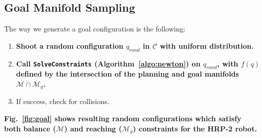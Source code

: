 \documentclass{article}
\newcommand\manifold{\mathcal{M}}
\newcommand\goalmanifold{\mathcal{M}_{g}}
\begin{document}
\subsection{Goal Manifold Sampling}
\label{sec:goal-sampling}

The way we generate a goal configuration is the following:
\begin{enumerate}
\item \textbf{Shoot a random configuration $q_{rand}$ in $\mathcal{C}$ with
  uniform distribution.}
\item \textbf{Call \texttt{SolveConstraints} (Algorithm~\ref{algo:newton}) on
  $q_{rand}$, with $f(q)$ defined by the intersection of the planning
  and goal manifolds $\manifold \cap \goalmanifold$.}
\item If success, check for collisions.
\end{enumerate}

\textbf{Fig.~\ref{fig:goal} shows resulting random configurations
  which satisfy both balance ($\manifold$) and reaching
  ($\goalmanifold$) constraints for the HRP-2 robot.}
\end{document}
